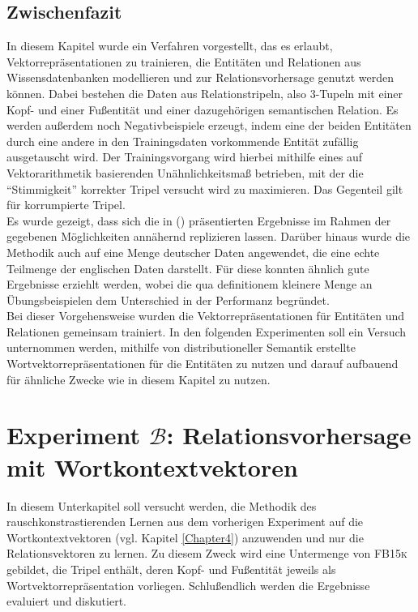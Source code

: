 \subsection{Zwischenfazit}

In diesem Kapitel wurde ein Verfahren vorgestellt, das es erlaubt, Vektorrepräsentationen zu trainieren, die Entitäten und Relationen
aus Wissensdatenbanken modellieren und zur Relationsvorhersage genutzt werden können. Dabei bestehen die Daten aus Relationstripeln,
also 3-Tupeln mit einer Kopf- und einer Fußentität und einer dazugehörigen semantischen Relation. Es werden außerdem noch
Negativbeispiele erzeugt, indem eine der beiden Entitäten durch eine andere in den Trainingsdaten vorkommende Entität zufällig ausgetauscht wird.
Der Trainingsvorgang wird hierbei mithilfe eines auf Vektorarithmetik basierenden Unähnlichkeitsmaß betrieben, mit der
die ``Stimmigkeit'' korrekter Tripel versucht wird zu maximieren. Das Gegenteil gilt für korrumpierte Tripel.\\
Es wurde gezeigt, dass sich die in (\cite{bordes2011learning}) präsentierten Ergebnisse im Rahmen der gegebenen Möglichkeiten
annähernd replizieren lassen. Darüber hinaus wurde die Methodik auch auf eine Menge deutscher Daten angewendet, die eine
echte Teilmenge der englischen Daten darstellt. Für diese konnten ähnlich gute Ergebnisse erziehlt werden, wobei die qua
definitionem kleinere Menge an Übungsbeispielen dem Unterschied in der Performanz begründet.\\

Bei dieser Vorgehensweise wurden die Vektorrepräsentationen für Entitäten und Relationen gemeinsam trainiert. In den folgenden
Experimenten soll ein Versuch unternommen werden, mithilfe von distributioneller Semantik erstellte Wortvektorrepräsentationen
für die Entitäten zu nutzen und darauf aufbauend für ähnliche Zwecke wie in diesem Kapitel zu nutzen.\\

\section{Experiment $\mathcal{B}$: Relationsvorhersage mit Wortkontextvektoren}\label{sec:exp-b}

In diesem Unterkapitel soll versucht werden, die Methodik des rauschkonstrastierenden Lernen aus dem vorherigen Experiment
auf die Wortkontextvektoren (vgl. Kapitel \ref{Chapter4}) anzuwenden und nur die Relationsvektoren zu lernen. Zu diesem Zweck
wird eine Untermenge von \textsc{FB15k} gebildet, die Tripel enthält, deren Kopf- und Fußentität jeweils als Wortvektorrepräsentation vorliegen.
Schlußendlich werden die Ergebnisse evaluiert und diskutiert.

